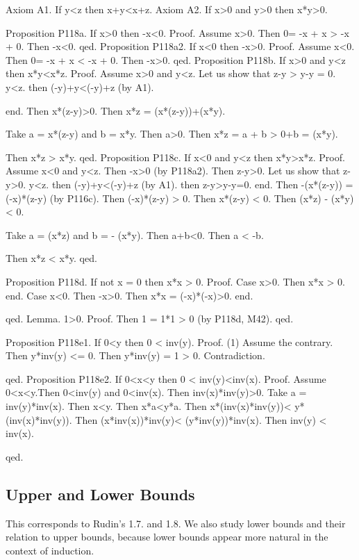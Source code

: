 \documentclass{article}
\newenvironment{forthel}{\begin{leftbar}}{\end{leftbar}}
\begin{document}
\begin{forthel}
	Axiom A1. If y<z then x+y<x+z.
	Axiom A2. If x>0 and y>0 then x*y>0.
	
	Proposition P118a. If x>0 then -x<0. 
	Proof.
	Assume x>0. Then 0= -x + x > -x + 0.
	Then -x<0.
	qed.
	Proposition P118a2. If x<0 then -x>0. 
	Proof.
	Assume x<0. Then 0= -x + x < -x + 0.
	Then -x>0.
	qed.
	Proposition P118b. If x>0 and y<z then x*y<x*z.
	Proof.
	Assume x>0 and y<z. 
	Let us show that z-y > y-y = 0.
	y<z.
	then (-y)+y<(-y)+z (by A1).
	
	end.
	Then x*(z-y)>0.
	Then x*z = (x*(z-y))+(x*y).
	
	Take a = x*(z-y) and b = x*y.
	Then a>0.
	Then x*z = a + b > 0+b = (x*y).
	
	Then x*z > x*y.
	qed.
	Proposition P118c. If x<0 and y<z then x*y>x*z.
	Proof.
	Assume x<0 and y<z.
	Then -x>0 (by P118a2).
	Then z-y>0. 
	Let us show that z-y>0.
	y<z.
	then (-y)+y<(-y)+z (by A1).
	then z-y>y-y=0.
	end.
	Then -(x*(z-y)) = (-x)*(z-y) (by P116c).
	Then (-x)*(z-y) > 0.
	Then x*(z-y) < 0.
	Then (x*z) - (x*y) < 0.
	
	Take a = (x*z) and b = - (x*y).
	Then a+b<0.
	Then a < -b.
	
	Then x*z < x*y.
	qed.
	
	Proposition P118d. If not x = 0 then x*x > 0.
	Proof.
	Case x>0. Then x*x > 0.
	end.
	Case x<0. Then -x>0. Then x*x = (-x)*(-x)>0.
	end.
	
	qed.
	Lemma. 1>0. 
	Proof.
	Then 1 = 1*1 > 0 (by P118d, M42).
	qed.
	
	Proposition P118e1. If 0<y then 0 < inv(y).
	Proof.
	(1) Assume the contrary.
	Then y*inv(y) <= 0.
	Then y*inv(y) = 1 > 0.
	Contradiction.
	
	qed.
	Proposition P118e2. If 0<x<y then 0 < inv(y)<inv(x).
	Proof. 
	Assume 0<x<y.Then 0<inv(y) and 0<inv(x).
	Then inv(x)*inv(y)>0.
	Take a = inv(y)*inv(x).	
	Then x<y. Then x*a<y*a.
	Then x*(inv(x)*inv(y))< y*(inv(x)*inv(y)).
	Then (x*inv(x))*inv(y)< (y*inv(y))*inv(x).
	Then inv(y) < inv(x).
	
	qed.
	

\end{forthel}

\subsection{Upper and Lower Bounds}
This corresponds to Rudin's 1.7. and 1.8. We also study lower bounds and their relation to upper bounds, because lower bounds appear more natural in the context of induction.
\end{document}
